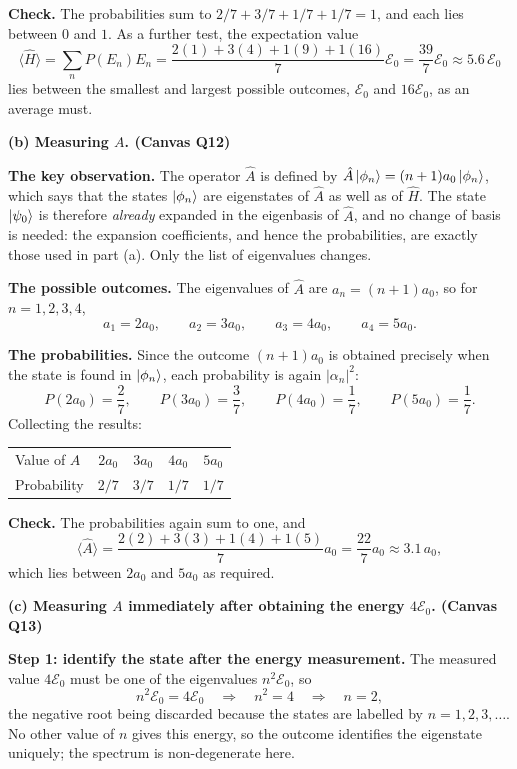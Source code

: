 \documentclass[12pt]{article}
\newcommand{\problemsep}{\vspace{0.8em}}
\begin{document}
\begin{solutionbox}
\textbf{Check.} The probabilities sum to $2/7+3/7+1/7+1/7=1$, and each lies between $0$ and $1$. As a further test, the expectation value
\[
    \langle \hat{H}\rangle=\sum_{n}P(E_{n})E_{n}
    =\frac{2(1)+3(4)+1(9)+1(16)}{7}\mathcal{E}_{0}
    =\frac{39}{7}\mathcal{E}_{0}\approx 5.6\,\mathcal{E}_{0}
\]
lies between the smallest and largest possible outcomes, $\mathcal{E}_{0}$ and $16\mathcal{E}_{0}$, as an average must.

\problemsep
\textbf{(b) Measuring $A$. \hfill (Canvas Q12)}

\textbf{The key observation.} The operator $\hat{A}$ is defined by $\hat{A}\ket{\phi_{n}}=(n+1)a_{0}\ket{\phi_{n}}$, which says that the states $\ket{\phi_{n}}$ are eigenstates of $\hat{A}$ as well as of $\hat{H}$. The state $\ket{\psi_{0}}$ is therefore \emph{already} expanded in the eigenbasis of $\hat{A}$, and no change of basis is needed: the expansion coefficients, and hence the probabilities, are exactly those used in part (a). Only the list of eigenvalues changes.

\textbf{The possible outcomes.} The eigenvalues of $\hat{A}$ are $a_{n}=(n+1)a_{0}$, so for $n=1,2,3,4$,
\[
    a_{1}=2a_{0},\qquad
    a_{2}=3a_{0},\qquad
    a_{3}=4a_{0},\qquad
    a_{4}=5a_{0}.
\]

\textbf{The probabilities.} Since the outcome $(n+1)a_{0}$ is obtained precisely when the state is found in $\ket{\phi_{n}}$, each probability is again $|\alpha_{n}|^{2}$:
\[
    P(2a_{0})=\frac{2}{7},\qquad
    P(3a_{0})=\frac{3}{7},\qquad
    P(4a_{0})=\frac{1}{7},\qquad
    P(5a_{0})=\frac{1}{7}.
\]
Collecting the results:
\begin{center}
\begin{tabular}{lcccc}
\hline
Value of $A$ & $2a_{0}$ & $3a_{0}$ & $4a_{0}$ & $5a_{0}$ \\
Probability & $2/7$ & $3/7$ & $1/7$ & $1/7$ \\
\hline
\end{tabular}
\end{center}

\textbf{Check.} The probabilities again sum to one, and
\[
    \langle \hat{A}\rangle=\frac{2(2)+3(3)+1(4)+1(5)}{7}a_{0}
    =\frac{22}{7}a_{0}\approx 3.1\,a_{0},
\]
which lies between $2a_{0}$ and $5a_{0}$ as required.

\problemsep
\textbf{(c) Measuring $A$ immediately after obtaining the energy $4\mathcal{E}_{0}$. \hfill (Canvas Q13)}

\textbf{Step 1: identify the state after the energy measurement.} The measured value $4\mathcal{E}_{0}$ must be one of the eigenvalues $n^{2}\mathcal{E}_{0}$, so
\[
    n^{2}\mathcal{E}_{0}=4\mathcal{E}_{0}
    \quad\Longrightarrow\quad
    n^{2}=4
    \quad\Longrightarrow\quad
    n=2,
\]
the negative root being discarded because the states are labelled by $n=1,2,3,\dots$. No other value of $n$ gives this energy, so the outcome identifies the eigenstate uniquely; the spectrum is non-degenerate here.


\end{solutionbox}
\end{document}
